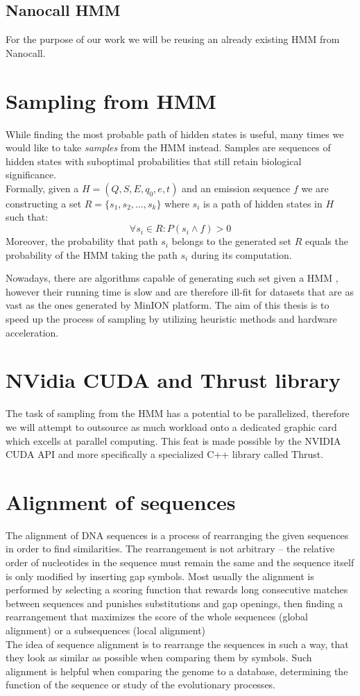 \subsection{Nanocall HMM}
For the purpose of our work we will be reusing an already existing HMM from Nanocall. 

\section{Sampling from HMM}
While finding the most probable path of hidden states is useful, many times we would like to take \emph{samples} from the HMM instead. Samples are sequences of hidden states with suboptimal probabilities that still retain biological significance.\\
Formally, given a $H = (Q,S,E,q_0,e,t)$ and an emission sequence $f$ we are constructing a set $R = \{s_1, s_2, \dots, s_k\}$ where $s_i$ is a path of hidden states in $H$ such that:
$$\forall s_i \in R: P(s_i \land f) > 0$$
Moreover, the probability that path $s_i$ belongs to the generated set $R$ equals the probability of the HMM taking the path $s_i$ during its computation.

Nowadays, there are algorithms capable of generating such set given a HMM \cite{cawley2003hmm}, however their running time is slow and are therefore ill-fit for datasets that are as vast as the ones generated by MinION platform.
The aim of this thesis is to speed up the process of sampling by utilizing heuristic methods and hardware acceleration.

\section{NVidia CUDA and Thrust library}
The task of sampling from the HMM has a potential to be parallelized, therefore we will attempt to outsource as much workload onto a dedicated graphic card which excells at parallel computing. This feat is made possible by the NVIDIA CUDA API and more specifically a specialized C++ library called Thrust. 

\section{Alignment of sequences}

The alignment of DNA sequences is a process of rearranging the given sequences in order to find similarities. The rearrangement is not arbitrary -- the relative order of nucleotides in the sequence must remain the same and the sequence itself is only modified by inserting gap symbols.
Most usually the alignment is performed by selecting a scoring function that rewards long consecutive matches between sequences and punishes substitutions and gap openings, then finding a rearrangement that maximizes the score of the whole sequences (global alignment) or a subsequences (local alignment)\\
The idea of sequence alignment is to rearrange the sequences in such a way, that they look as similar as possible when comparing them by symbols. Such alignment is helpful when comparing the genome to a database, determining the function of the sequence or study of the evolutionary processes.

